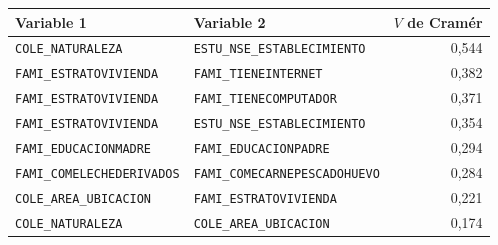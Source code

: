 \begingroup\scriptsize{}
\par\medskip
\noindent\begin{minipage}{\textwidth}
\centering
{}\label{tab:cramer}
\begin{tabular}{P{5.4cm} P{5.4cm} r}
  \toprule
  \textbf{Variable 1} & \textbf{Variable 2} & \textbf{$V$ de Cramér} \\
  \midrule

  \texttt{COLE\_NATURALEZA} & \texttt{ESTU\_NSE\_ESTABLECIMIENTO} & 0,544 \\
  \texttt{FAMI\_ESTRATOVIVIENDA} & \texttt{FAMI\_TIENEINTERNET} & 0,382 \\
  \texttt{FAMI\_ESTRATOVIVIENDA} & \texttt{FAMI\_TIENECOMPUTADOR} & 0,371 \\
  \texttt{FAMI\_ESTRATOVIVIENDA} & \texttt{ESTU\_NSE\_ESTABLECIMIENTO} & 0,354 \\
  \texttt{FAMI\_EDUCACIONMADRE} & \texttt{FAMI\_EDUCACIONPADRE} & 0,294 \\
  \texttt{FAMI\_COMELECHEDERIVADOS} & \texttt{FAMI\_COMECARNEPESCADOHUEVO} & 0,284 \\
  \texttt{COLE\_AREA\_UBICACION} & \texttt{FAMI\_ESTRATOVIVIENDA} & 0,221 \\
  \texttt{COLE\_NATURALEZA} & \texttt{COLE\_AREA\_UBICACION} & 0,174 \\
  \bottomrule
\end{tabular}
\end{minipage}
\par\medskip
\endgroup
